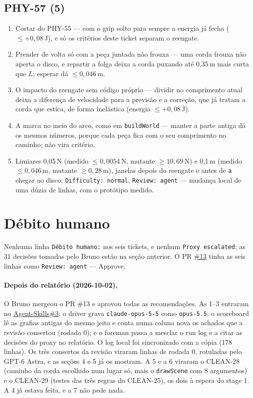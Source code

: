 \documentclass[11pt,a4paper]{article}
\begin{document}
{\subsection*{PHY-57 (5)}
\begin{enumerate}
  \item Cortar do PHY-55 --- com o grip solto para sempre a energia já fecha
        ($\leq +0{,}08$\,J), e só os critérios deste ticket separam o
        reengate.
  \item Prender de volta só com a peça juntada não frouxa --- uma corda frouxa
        não aperta o disco, e repartir a folga deixa a corda puxando até
        0,35\,m mais curta que $L$; esperar dá $\leq 0{,}046$\,m.
  \item O impacto do reengate sem código próprio --- dividir no comprimento
        atual deixa a diferença de velocidade para a previsão e a correção, que
        já tratam a corda que estica, de forma inelástica (energia
        $\leq +0{,}08$\,J).
  \item A marca no meio do arco, como em \texttt{buildWorld} --- manter a
        parte antiga dá os mesmos números, porque cada peça fica com o seu
        comprimento no caminho; não vira critério.
  \item Limiares 0,05\,N (medido $\leq 0{,}0054$\,N, mutante
        $\geq 10{,}69$\,N) e 0,1\,m (medido $\leq 0{,}046$\,m, mutante
        $\geq 0{,}28$\,m), janelas depois do reengate e antes de \texttt{a}
        chegar ao disco; \texttt{Difficulty: normal}, \texttt{Review: agent}
        --- mudança local de uma dúzia de linhas, com o protótipo medido.
\end{enumerate}
}

\section{Débito humano}

Nenhuma linha \texttt{Débito humano:} nos seis tickets, e nenhum
\texttt{Proxy escalated}; as 31 decisões tomadas pelo Bruno estão na seção
anterior. O PR \href{https://github.com/Laginho/PhysiSyst/pull/13}{\#13} tinha
as seis linhas como \texttt{Review: agent} --- Approve.

\paragraph{Depois do relatório (2026-10-02).} O Bruno mergeou o PR \#13 e
aprovou todas as recomendações. As 1--3 entraram no
\href{https://github.com/Laginho/Agent-Skills/pull/3}{Agent-Skills\#3}: o driver
grava \texttt{claude-opus-5-5} como \texttt{opus-5.5}; o scoreboard lê as
grafias antigas do mesmo jeito e conta numa coluna nova os achados que a
revisão consertou (rodada 0); e o foreman passa a mesclar o run log e a citar
as decisões do proxy no relatório. O log local foi sincronizado com a cópia
(178 linhas). Os três consertos da revisão viraram linhas de rodada 0,
rotuladas pelo GPT-6 Astra, e as seções 4 e 5 já os mostram. A 5 e a 6 viraram o CLEAN-28 (caminho da corda escolhido num
lugar só, mais o \texttt{drawScene} com 8 argumentos) e o CLEAN-29 (testes das
três regras do CLEAN-25), os dois à espera do stage 1. A 4 já estava feita, e a
7 não pede nada.
\end{document}
